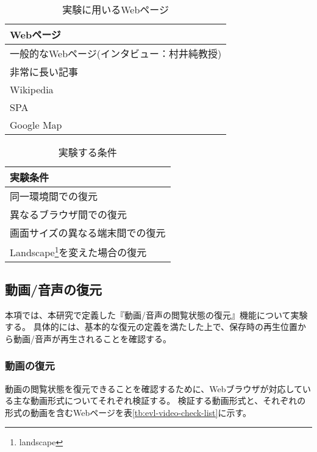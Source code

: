 \begin{table}[htbp]
  \label{tb:evl-basic-web-contents}
  \caption{実験に用いるWebページ}
  \begin{center}
    \begin{tabular}{|l|}
    \hline
    Webページ  \\ \hline
    一般的なWebページ(インタビュー：村井純教授) \\ \hline
    非常に長い記事 \\ \hline
    Wikipedia \\ \hline
    SPA \\ \hline
    Google Map \\ \hline
    \end{tabular}
  \end{center}
\end{table}

\begin{table}[htbp]
  \label{tb:evl-basic-conditions}
  \caption{実験する条件}
  \begin{center}
    \begin{tabular}{|l|}
    \hline
    実験条件  \\ \hline
    同一環境間での復元 \\ \hline
    異なるブラウザ間での復元 \\ \hline
    画面サイズの異なる端末間での復元 \\ \hline
    Landscape\footnote{landscape}を変えた場合の復元 \\ \hline
    \end{tabular}
  \end{center}
\end{table}

\subsection{動画/音声の復元}
本項では、本研究で定義した『動画/音声の閲覧状態の復元』機能について実験する。
具体的には、基本的な復元の定義を満たした上で、保存時の再生位置から動画/音声が再生されることを確認する。

\subsubsection{動画の復元}
動画の閲覧状態を復元できることを確認するために、Webブラウザが対応している主な動画形式についてそれぞれ検証する。
検証する動画形式と、それぞれの形式の動画を含むWebページを表\ref{tb:evl-video-check-list}に示す。

